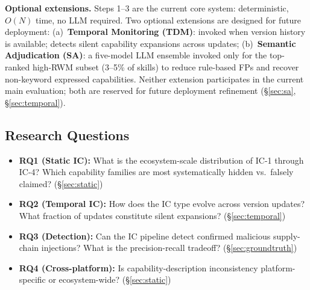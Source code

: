 \noindent\textbf{Optional extensions.}
Steps 1--3 are the current core system: deterministic, $O(N)$ time,
no LLM required. Two optional extensions are designed for future deployment:
(a)~\textbf{Temporal Monitoring (TDM)}: invoked when version history is
available; detects silent capability expansions across updates;
(b)~\textbf{Semantic Adjudication (SA)}: a five-model LLM ensemble invoked
only for the top-ranked high-RWM subset (3--5\% of skills) to reduce
rule-based FPs and recover non-keyword expressed capabilities.
Neither extension participates in the current main evaluation;
both are reserved for future deployment refinement (\S\ref{sec:sa}, \S\ref{sec:temporal}).

\subsection{Research Questions}

\begin{itemize}[topsep=3pt,itemsep=2pt]
\item \textbf{RQ1 (Static IC):} What is the ecosystem-scale distribution
  of IC-1 through IC-4? Which capability families are most systematically
  hidden vs.\ falsely claimed? (\S\ref{sec:static})
\item \textbf{RQ2 (Temporal IC):} How does the IC type evolve across version
  updates? What fraction of updates constitute silent expansions? (\S\ref{sec:temporal})
\item \textbf{RQ3 (Detection):} Can the IC pipeline detect confirmed
  malicious supply-chain injections? What is the precision-recall tradeoff? (\S\ref{sec:groundtruth})
\item \textbf{RQ4 (Cross-platform):} Is capability-description inconsistency
  platform-specific or ecosystem-wide? (\S\ref{sec:static})
\end{itemize}
